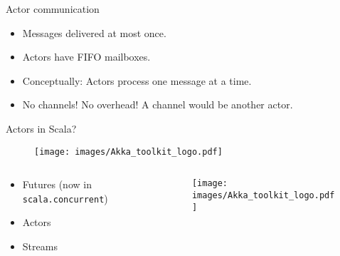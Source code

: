 \documentclass[aspectratio=169,14pt]{beamer}
\newcommand{\megatext}[1]{
  \begin{center}
    \Huge
    #1
  \end{center}
}
\begin{document}
\begin{frame}{Actor communication}
  \begin{figure}
  \end{figure}

  \begin{itemize}
  \item Messages delivered at most once.
  \item Actors have FIFO mailboxes.
  \item Conceptually: Actors process one message at a time.
  \item No channels! No overhead! A channel would be another actor.
  \end{itemize}
\end{frame}


\begin{frame}
  \megatext{Actors in Scala?}
\end{frame}


\begin{frame}
  \begin{figure}
    \texttt{[image: images/Akka\_toolkit\_logo.pdf]}
  \end{figure}
\end{frame}


\begin{frame}
  \begin{columns}[c]
    \begin{column}{0.5\textwidth}
      \begin{itemize}
      \item Futures (now in \texttt{scala.concurrent})
      \item Actors
      \item Streams
      \end{itemize}
    \end{column}

    \begin{column}{0.5\textwidth}
      \begin{figure}
        \texttt{[image: images/Akka\_toolkit\_logo.pdf]}
      \end{figure}
    \end{column}
  \end{columns}
\end{frame}
\end{document}
